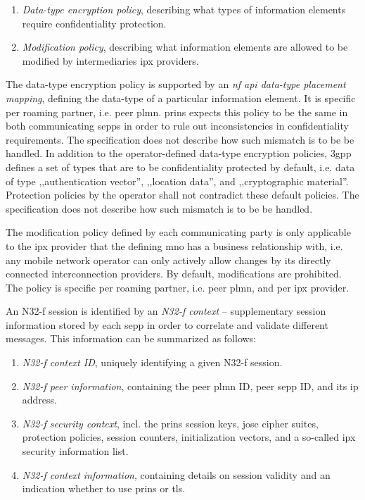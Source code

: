 \begin{enumerate}[label=--]
    \item \textit{Data-type encryption policy}, describing what types of information elements require confidentiality protection.
    \item \textit{Modification policy}, describing what information elements are allowed to be modified by intermediaries \gls{ipx} providers.
\end{enumerate}

The data-type encryption policy is supported by an \textit{\gls{nf} \gls{api} data-type placement mapping}, defining the data-type of a particular information element.
It is specific per roaming partner, i.e. peer \gls{plmn}.
\gls{prins} expects this policy to be the same in both communicating \glspl{sepp} in order to rule out inconsistencies in confidentiality requirements.
The specification does not describe how such mismatch is to be be handled.
In addition to the operator-defined data-type encryption policies, \gls{3gpp} defines a set of types that are to be confidentiality protected by default, i.e. data of type ,,authentication vector'', ,,location data'', and ,,cryptographic material''.
Protection policies by the operator shall not contradict these default policies.
The specification does not describe how such mismatch is to be be handled.

The modification policy defined by each communicating party is only applicable to the \gls{ipx} provider that the defining \gls{mno} has a business relationship with, i.e. any mobile network operator can only actively allow changes by its directly connected interconnection providers.
By default, modifications are prohibited.
The policy is specific per roaming partner, i.e. peer \gls{plmn}, and per \gls{ipx} provider.

An N32-f session is identified by an \textit{N32-f context} -- supplementary session information stored by each \gls{sepp} in order to correlate and validate different messages.
This information can be summarized as follows:

\begin{enumerate}[label=--]
    \item \textit{N32-f context ID}, uniquely identifying a given N32-f session.
    \item \textit{N32-f peer information}, containing the peer \gls{plmn} ID, peer \gls{sepp} ID, and its \gls{ip} address.
    \item \textit{N32-f security context}, incl. the \gls{prins} session keys, \gls{jose} cipher suites, protection policies, session counters, initialization vectors, and a so-called \gls{ipx} security information list.
    \item \textit{N32-f context information}, containing details on session validity and an indication whether to use \gls{prins} or \gls{tls}.
\end{enumerate}

